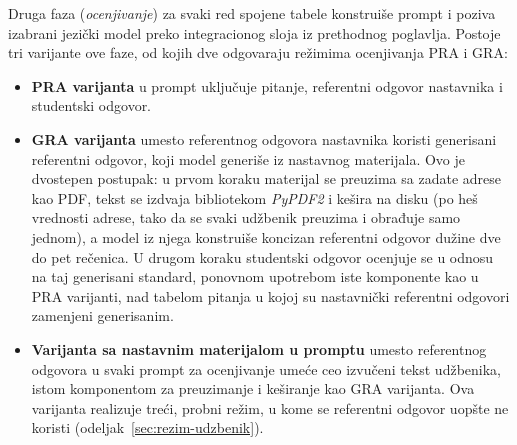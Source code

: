 Druga faza (\emph{ocenjivanje}) za svaki red spojene tabele konstruiše prompt
i poziva izabrani jezički model preko integracionog sloja iz prethodnog poglavlja.
Postoje tri varijante ove faze, od kojih dve odgovaraju režimima ocenjivanja PRA i GRA:

\begin{itemize}
    \item \textbf{PRA varijanta} u prompt uključuje pitanje, referentni odgovor nastavnika i studentski odgovor.
    \item \textbf{GRA varijanta} umesto referentnog odgovora nastavnika koristi generisani referentni odgovor,
    koji model generiše iz nastavnog materijala.
    Ovo je dvostepen postupak: u prvom koraku materijal se preuzima sa zadate adrese kao PDF,
    tekst se izdvaja bibliotekom \emph{PyPDF2} i kešira na disku
    (po heš vrednosti adrese, tako da se svaki udžbenik preuzima i obrađuje samo jednom),
    a model iz njega konstruiše koncizan referentni odgovor dužine dve do pet rečenica.
    U drugom koraku studentski odgovor ocenjuje se u odnosu na taj generisani standard, ponovnom upotrebom iste komponente kao u PRA varijanti,
    nad tabelom pitanja u kojoj su nastavnički referentni odgovori zamenjeni generisanim.
    \item \textbf{Varijanta sa nastavnim materijalom u promptu} umesto referentnog odgovora
    u svaki prompt za ocenjivanje umeće ceo izvučeni tekst udžbenika, istom komponentom za preuzimanje i keširanje kao GRA varijanta.
    Ova varijanta realizuje treći, probni režim, u kome se referentni odgovor uopšte ne koristi (odeljak~\ref{sec:rezim-udzbenik}).
\end{itemize}

